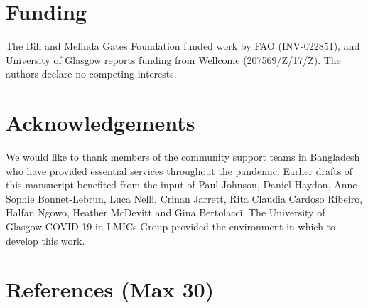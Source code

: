 \documentclass[]{elsarticle} %
\begin{document}
\hypertarget{funding}{%
\section{Funding}\label{funding}}

The Bill and Melinda Gates Foundation funded work by FAO (INV-022851), and University of Glasgow reports funding from Wellcome (207569/Z/17/Z).
The authors declare no competing interests.

\hypertarget{acknowledgements}{%
\section{Acknowledgements}\label{acknowledgements}}

We would like to thank members of the community support teams in Bangladesh who have provided essential services throughout the pandemic.
Earlier drafts of this mansucript benefited from the input of Paul Johnson, Daniel Haydon, Anne-Sophie Bonnet-Lebrun, Luca Nelli, Crinan Jarrett, Rita Claudia Cardoso Ribeiro, Halfan Ngowo, Heather McDevitt and Gina Bertolacci.
The University of Glasgow COVID-19 in LMICs Group provided the environment in which to develop this work.

\hypertarget{references-max-30}{%
\section*{References (Max 30)}\label{references-max-30}}
\end{document}
